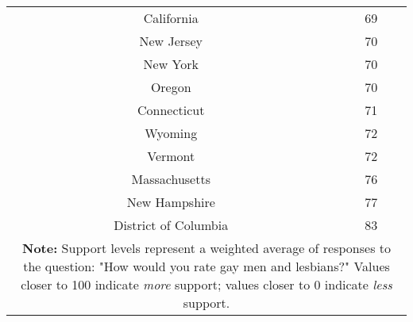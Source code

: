 \begin{spacing}{1}
\begin{longtable}{|c|c|}
California & 69\\
New Jersey & 70\\
New York & 70\\
Oregon & 70\\
Connecticut & 71\\
Wyoming & 72\\
Vermont & 72\\
Massachusetts & 76\\
New Hampshire & 77\\
District of Columbia & 83\\
\hline
\multicolumn{2}{p{0.8\linewidth}}{\small \textbf{Note:} Support levels represent a weighted average of responses to the question: "How would you rate gay men and lesbians?" Values closer to 100 indicate \textit{more} support; values closer to 0 indicate \textit{less} support.} \\ 
\end{longtable}
\end{spacing}

